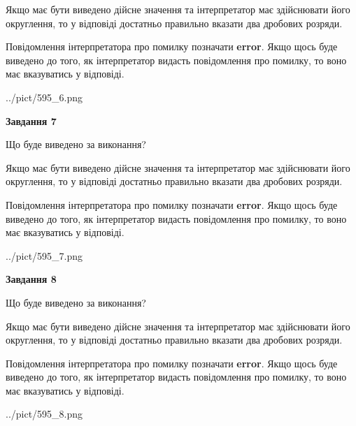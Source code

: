 \documentclass[12pt, ukrainian]{article}
\begin{document}
{\begin {Large}
Якщо має бути виведено дійсне значення та інтерпретатор має здійснювати його округлення, 
то у відповіді достатньо правильно вказати два дробових розряди.

Повідомлення інтерпретатора про помилку позначати \textbf{error}.
Якщо щось буде виведено до того, як інтерпретатор видасть повідомлення про помилку, 
то воно має вказуватись у відповіді. \par

\begin{center}
	{../pict/595_6.png}
\end{center}
\newpage

{\begin {center}\textbf{Завдання 7}\end {center}}\par
Що буде виведено за виконання? \par

Якщо має бути виведено дійсне значення та інтерпретатор має здійснювати його округлення, 
то у відповіді достатньо правильно вказати два дробових розряди.

Повідомлення інтерпретатора про помилку позначати \textbf{error}.
Якщо щось буде виведено до того, як інтерпретатор видасть повідомлення про помилку, 
то воно має вказуватись у відповіді. \par

\begin{center}
	{../pict/595_7.png}
\end{center}
\newpage

{\begin {center}\textbf{Завдання 8}\end {center}}\par
Що буде виведено за виконання? \par

Якщо має бути виведено дійсне значення та інтерпретатор має здійснювати його округлення, 
то у відповіді достатньо правильно вказати два дробових розряди.

Повідомлення інтерпретатора про помилку позначати \textbf{error}.
Якщо щось буде виведено до того, як інтерпретатор видасть повідомлення про помилку, 
то воно має вказуватись у відповіді. \par

\begin{center}
	{../pict/595_8.png}
\end{center}
\newpage


\end{Large}}
\end{document}
